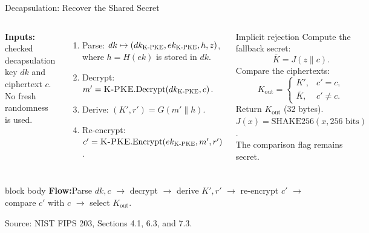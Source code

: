 \documentclass[aspectratio=169,11pt]{beamer}
\newcommand{\source}[1]{\par\vspace{-0.15cm}\hfill{\fontsize{4.5}{5.2}\selectfont\color{Slate!65}Source: NIST FIPS 203, #1.}}
\newcommand{\PKE}{\textsc{K-PKE}}
\begin{document}
\begin{frame}{Decapsulation: Recover the Shared Secret}
  \small
  \begin{columns}[T,onlytextwidth]
      \textbf{Inputs:} checked decapsulation key $dk$ and ciphertext $c$. No fresh randomness is used.
      \vspace{0.10cm}
      \footnotesize
      \begin{enumerate}
        \setlength{\itemsep}{0.17em}
        \item Parse: $dk\mapsto(dk_{\PKE},ek_{\PKE},h,z)$, where $h=H(ek)$ is stored in $dk$.
        \item Decrypt: $m'=\PKE.\mathrm{Decrypt}(dk_{\PKE},c)$.
        \item Derive: $(K',r')=G(m'\parallel h)$.
        \item Re-encrypt: $c'=\PKE.\mathrm{Encrypt}(ek_{\PKE},m',r')$.
      \end{enumerate}
      \begin{block}{Implicit rejection}
        \centering
        \footnotesize
        Compute the fallback secret:
        \[
          \overline K=J(z\parallel c).
        \]
        Compare the ciphertexts:
        \[
          K_{\mathrm{out}}=
          \begin{cases}
            K', & c'=c,\\[2pt]
            \overline K, & c'\ne c.
          \end{cases}
        \]
        Return $K_{\mathrm{out}}$ (32 bytes).\\[2pt]
        $J(x)=\mathrm{SHAKE256}(x,256\text{ bits})$.\\[2pt]
        \scriptsize The comparison flag remains secret.
      \end{block}
  \end{columns}
  \vspace{0.06cm}
  \begin{beamercolorbox}[rounded=true,sep=0.30em,wd=\linewidth,center]{block body}
    \scriptsize
    \textbf{Flow:}\quad Parse $dk,c$ $\longrightarrow$ decrypt $\longrightarrow$ derive $K',r'$ $\longrightarrow$ re-encrypt $c'$ $\longrightarrow$ compare $c'$ with $c$ $\longrightarrow$ select $K_{\mathrm{out}}$.
  \end{beamercolorbox}
  \source{Sections 4.1, 6.3, and 7.3}
\end{frame}
\end{document}
